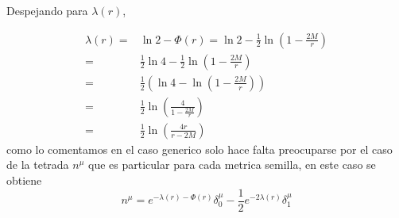Despejando para $\lambda(r)$,

\begin{equation}
    \begin{aligned}
        \lambda(r)= & \ln 2-\Phi(r)=\ln 2-\frac{1}{2} \ln \left(1-\frac{2 M}{r}\right)   \\
        =           & \frac{1}{2}\ln 4 -\frac{1}{2} \ln \left(1-\frac{2 M}{r}\right)     \\
        =           & \frac{1}{2} \left(\ln 4 -  \ln \left(1-\frac{2 M}{r}\right)\right) \\
        =           & \frac{1}{2} \ln \left(\frac{4}{1-\frac{2 M}{r}}\right)             \\
        =           & \frac{1}{2} \ln \left(\frac{4 r}{r-2 M}\right)
    \end{aligned}
\end{equation}
como lo comentamos en el caso generico solo hace falta preocuparse por el caso de la tetrada $n^\mu$ que es particular para cada metrica semilla, en este caso se obtiene
\begin{equation}
    n^\mu=e^{-\lambda(r)-\Phi(r)} \delta_0^\mu-\frac{1}{2} e^{-2 \lambda(r)} \delta_1^\mu
\end{equation}
